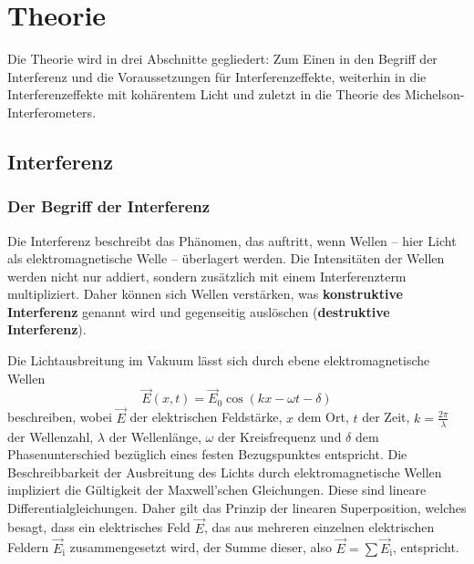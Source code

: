 \section{Theorie}
\label{sec:Theorie}

Die Theorie wird in drei Abschnitte gegliedert: Zum Einen in den Begriff der Interferenz und 
die Voraussetzungen für Interferenzeffekte, weiterhin in die Interferenzeffekte mit 
kohärentem Licht und zuletzt in die Theorie des Michelson-Interferometers.


\subsection{Interferenz}
\label{sec:interferenz}

\subsubsection{Der Begriff der Interferenz}
\label{sec:interferenzdef}
Die Interferenz beschreibt das Phänomen, das auftritt, wenn Wellen -- hier Licht als 
elektromagnetische Welle -- überlagert werden. 
Die Intensitäten der Wellen werden nicht nur addiert, sondern zusätzlich mit einem
Interferenzterm multipliziert. Daher können sich Wellen verstärken, was \textbf{konstruktive 
Interferenz} genannt wird und gegenseitig auslöschen (\textbf{destruktive Interferenz}).

Die Lichtausbreitung im Vakuum lässt sich durch ebene elektromagnetische Wellen
\begin{equation}
	\label{eqn:ebenewelle}
	\vec{E}(x,t) = \vec{E}_0 \cos(k x - \omega t - \delta) 
\end{equation}
beschreiben, wobei $\vec{E}$ der elektrischen Feldstärke, $x$ dem Ort, $t$ der Zeit, $k=\frac{2\pi}{\lambda}$ der Wellenzahl, $\lambda$
der Wellenlänge, $\omega$ der Kreisfrequenz und $\delta$ dem Phasenunterschied bezüglich eines 
festen Bezugspunktes entspricht.
Die Beschreibbarkeit der Ausbreitung des Lichts durch elektromagnetische Wellen impliziert die 
Gültigkeit der Maxwell'schen Gleichungen. Diese sind lineare Differentialgleichungen. Daher 
gilt das Prinzip der linearen Superposition, welches besagt, dass ein elektrisches Feld
$\vec{E}$, das aus mehreren einzelnen elektrischen Feldern $\vec{E}_{\mathrm{i}}$
zusammengesetzt wird, der Summe dieser, also $\vec{E} = \sum \vec{E}_{\mathrm{i}}$, entspricht.

